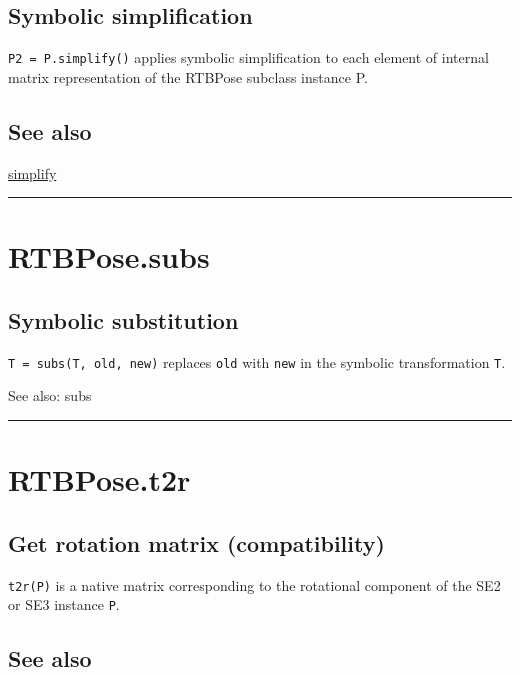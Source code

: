 \subsection*{Symbolic simplification}


\texttt{P2 = P.simplify()} applies symbolic simplification to each element of
internal matrix representation of the RTBPose subclass instance P.


\subsection*{See also}


\hyperlink{simplify}{\color{blue} simplify}

\vspace{1.5ex}\hrule

\hypertarget{RTBPose.subs}{\section*{RTBPose.subs}}
\subsection*{Symbolic substitution}


\texttt{T = subs(T, old, new)} replaces \texttt{old} with \texttt{new} in the symbolic
transformation \texttt{T}.



See also: subs

\vspace{1.5ex}\hrule

\hypertarget{RTBPose.t2r}{\section*{RTBPose.t2r}}
\subsection*{Get rotation matrix  (compatibility)}


\texttt{t2r(P)} is a native matrix corresponding to the rotational
component of the SE2 or SE3 instance \texttt{P}.


\subsection*{See also}


